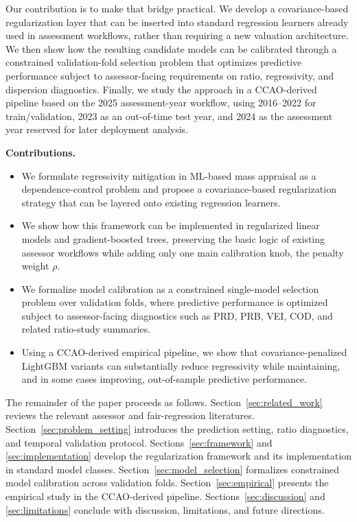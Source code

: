\documentclass[12pt]{article}
\theoremstyle{plain}
\theoremstyle{definition}
\begin{document}
Our contribution is to make that bridge practical. We develop a covariance-based regularization layer that can be inserted into standard regression learners already used in assessment workflows, rather than requiring a new valuation architecture. We then show how the resulting candidate models can be calibrated through a constrained validation-fold selection problem that optimizes predictive performance subject to assessor-facing requirements on ratio, regressivity, and dispersion diagnostics. Finally, we study the approach in a CCAO-derived pipeline based on the 2025 assessment-year workflow, using 2016--2022 for train/validation, 2023 as an out-of-time test year, and 2024 as the assessment year reserved for later deployment analysis.

\noindent\textbf{Contributions.}
\begin{itemize}[leftmargin=1.5em]
    \item We formulate regressivity mitigation in ML-based mass appraisal as a dependence-control problem and propose a covariance-based regularization strategy that can be layered onto existing regression learners.
    \item We show how this framework can be implemented in regularized linear models and gradient-boosted trees, preserving the basic logic of existing assessor workflows while adding only one main calibration knob, the penalty weight \(\rho\).
    \item We formalize model calibration as a constrained single-model selection problem over validation folds, where predictive performance is optimized subject to assessor-facing diagnostics such as PRD, PRB, VEI, COD, and related ratio-study summaries.
    \item Using a CCAO-derived empirical pipeline, we show that covariance-penalized LightGBM variants can substantially reduce regressivity while maintaining, and in some cases improving, out-of-sample predictive performance.
\end{itemize}

The remainder of the paper proceeds as follows. Section~\ref{sec:related_work} reviews the relevant assessor and fair-regression literatures. Section~\ref{sec:problem_setting} introduces the prediction setting, ratio diagnostics, and temporal validation protocol. Sections~\ref{sec:framework} and \ref{sec:implementation} develop the regularization framework and its implementation in standard model classes. Section~\ref{sec:model_selection} formalizes constrained model calibration across validation folds. Section~\ref{sec:empirical} presents the empirical study in the CCAO-derived pipeline. Sections~\ref{sec:discussion} and \ref{sec:limitations} conclude with discussion, limitations, and future directions.
\end{document}

